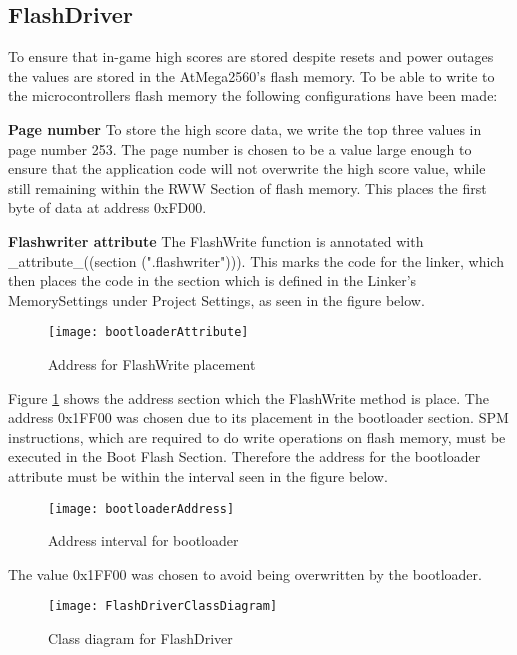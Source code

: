 \subsection{FlashDriver}
	To ensure that in-game high scores are stored despite resets and power outages the values are stored in the AtMega2560's flash memory. To be able to write to the microcontrollers flash memory the following configurations have been made:
	
	\textbf{Page number} \newline
		To store the high score data, we write the top three values in page number 253. The page number is chosen to be a value large enough to ensure that the application code will not overwrite the high score value, while still remaining within the RWW Section of flash memory. This places the first byte of data at address 0xFD00.
	
	\textbf{Flashwriter attribute} \newline
		The FlashWrite function is annotated with \_attribute\_((section (".flashwriter"))). This marks the code for the linker, which then places the code in the  section which is defined in the Linker's MemorySettings under Project Settings, as seen in the figure below.
		
			\begin{figure}[H]
				\centering
				\texttt{[image: bootloaderAttribute]}
				\caption{Address for FlashWrite placement}
				\label{fig:flashwriter}
			\end{figure}
		
		Figure \ref{fig:flashwriter} shows the address section which the FlashWrite method is place. The address 0x1FF00 was chosen due to its placement in the bootloader section. SPM instructions, which are required to do write operations on flash memory, must be executed in the Boot Flash Section. Therefore the address for the bootloader attribute must be within the interval seen in the figure below.
		
			\begin{figure}[H]
				\centering
				\texttt{[image: bootloaderAddress]}
				\caption{Address interval for bootloader}
				\label{fig:bootloaderAddress}
			\end{figure}
	
		The value 0x1FF00 was chosen to avoid being overwritten by the bootloader.

			\begin{figure}[H]
				\centering
				\texttt{[image: FlashDriverClassDiagram]}
				\caption{Class diagram for FlashDriver}
				\label{fig:FlashDriverClassDiagram}
			\end{figure}	

